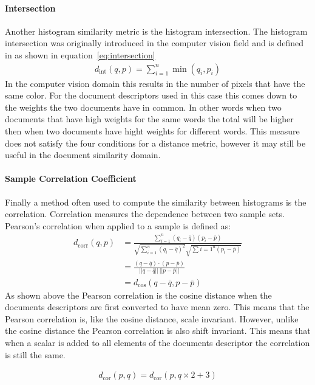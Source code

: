 \paragraph{Intersection} Another histogram similarity metric is the histogram
intersection. The histogram intersection \citep{swain1991color} was originally
introduced in the computer vision field and is defined in as shown in
equation~\ref{eq:intersection}
\begin{align}
  d_\textrm{int}(q,p) = \sum_{i=1}^n \min(q_i, p_i) \label{eq:intersection}
\end{align}
In the computer vision domain this results in the number of pixels that have
the same color. For the document descriptors used in this case this comes
down to the weights the two documents have in common. In other words when
two documents that have high weights for the same words the total will be
higher then when two documents have hight weights for different words. This
measure does not satisfy the four conditions for a distance metric, however
it may still be useful in the document similarity domain.

\paragraph{Sample Correlation Coefficient} Finally a method often used to compute the
similarity between histograms is the correlation. Correlation measures
the dependence between two sample sets. Pearson's correlation when applied to
a sample is defined as:
\begin{align}
  d_{\textrm{corr}}(q,p) &= \frac{\sum_{i=1}^n(q_i - \overline{q})(p_i - \overline{p})}{\sqrt{\sum_{i=1}^n(q_i - \overline{q})^2}\sqrt{\sum{i=1}^n(p_i - \overline{p})}} \\
    &= \frac{(q - \overline{q}) \cdot (p - \overline{p})}{||q - \overline{q}||\,||p - \overline{p}||} \\
    &= d_\textrm{cos}(q - \overline{q}, p - \overline{p})
\end{align}
As shown above the Pearson correlation is the cosine distance when the 
documents descriptors are first converted to have mean zero. This means that
the Pearson correlation is, like the cosine distance, scale invariant. However,
unlike the cosine distance the Pearson correlation is also shift invariant. This
means that when a scalar is added to all elements of the documents descriptor
the correlation is still the same.

\begin{align*}
  d_\textrm{cor}(p,q) = d_\textrm{cor}(p, q\times2 + 3)
\end{align*}
